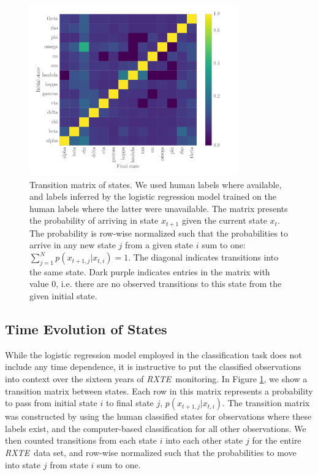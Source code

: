 \documentclass[12pt]{emulateapj}
\newcommand{\project}[1]{\textsl{#1}}
\newcommand{\rxte}{\project{RXTE}}
\begin{document}
\begin{figure}[htbp]
\begin{center}
\includegraphics[width=9cm]{grs1915_supervised_transmat.pdf}
\caption{Transition matrix of states. We used human labels where available, and labels inferred by the logistic regression model trained on the human labels where 
the latter were unavailable. The matrix presents the probability of arriving in state $x_{t+1}$ given the current state $x_{t}$. The probability is row-wise normalized 
such that the probabilities to arrive in any new state $j$ from a given state $i$ sum to one: $\sum_{j=1}^{N}p(x_{t+1,j} | x_{t,i}) = 1$. The diagonal indicates transitions into the same state. Dark purple indicates entries in the matrix with value $0$, i.e. there are no observed transitions to this state from the given initial state.} 
\label{fig:transitionmatrix}
\end{center}
\end{figure}

\subsection{Time Evolution of States}

While the logistic regression model employed in the classification task does not include any time dependence, it is instructive to put the classified observations 
into context over the sixteen years of \rxte\ monitoring. In Figure \ref{fig:transitionmatrix}, we show a transition matrix between states. Each row in this matrix 
represents a probability to pass from initial state $i$ to final state $j$, $p(x_{t+1, j} | x_{t, i})$. The transition matrix was constructed by using the human 
classified states for observations where these labels exist, and the computer-based classification for all other observations. We then counted transitions from each 
state $i$ into each other state $j$ for the entire \rxte\ data set, and row-wise normalized such that the probabilities to move into state $j$ from state $i$ sum to one.
\end{document}
